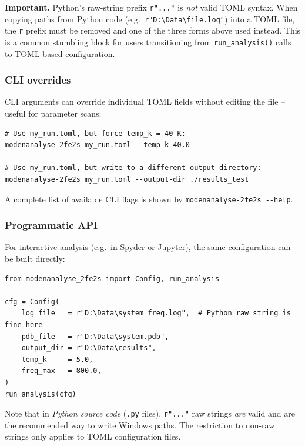 \documentclass[11pt,a4paper,twoside]{article}
\theoremstyle{remark}
\begin{document}
\begin{warnbox}
\textbf{Important.} Python's raw-string prefix \texttt{r"..."} is
\emph{not} valid TOML syntax. When copying paths from Python code
(e.g.\ \texttt{r"D:\textbackslash{}Data\textbackslash{}file.log"})
into a TOML file, the \texttt{r} prefix must be removed and one of
the three forms above used instead. This is a common stumbling
block for users transitioning from \texttt{run\_analysis()} calls
to TOML-based configuration.
\end{warnbox}

\subsubsection*{CLI overrides}

CLI arguments can override individual TOML fields without editing
the file -- useful for parameter scans:

\begin{lstlisting}[style=bash]
# Use my_run.toml, but force temp_k = 40 K:
modenanalyse-2fe2s my_run.toml --temp-k 40.0

# Use my_run.toml, but write to a different output directory:
modenanalyse-2fe2s my_run.toml --output-dir ./results_test
\end{lstlisting}

A complete list of available CLI flags is shown by
\texttt{modenanalyse-2fe2s -{}-help}.

\subsubsection*{Programmatic API}

For interactive analysis (e.g.\ in Spyder or Jupyter), the same
configuration can be built directly:

\begin{lstlisting}[style=python]
from modenanalyse_2fe2s import Config, run_analysis

cfg = Config(
    log_file   = r"D:\Data\system_freq.log",  # Python raw string is fine here
    pdb_file   = r"D:\Data\system.pdb",
    output_dir = r"D:\Data\results",
    temp_k     = 5.0,
    freq_max   = 800.0,
)
run_analysis(cfg)
\end{lstlisting}

Note that in \emph{Python source code} (\texttt{.py} files),
\texttt{r"..."} raw strings \emph{are} valid and are the recommended
way to write Windows paths. The restriction to non-raw strings only
applies to TOML configuration files.
\end{document}
